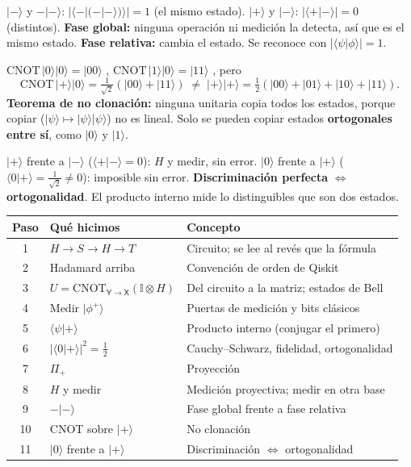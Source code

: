 \documentclass[11pt, a4paper, twoside, openright]{report}
\begin{document}
{$|-\rangle$ y $-|-\rangle$: \; $|\langle-|(-|-\rangle)\rangle| = 1$ \; (el mismo estado). \qquad $|+\rangle$ y $|-\rangle$: \; $|\langle+|-\rangle| = 0$ \; (distintos).}
{\textbf{Fase global:} ninguna operación ni medición la detecta, así que es el mismo estado. \textbf{Fase relativa:} cambia el estado. Se reconoce con $|\langle\psi|\phi\rangle| = 1$.}

{$\mathrm{CNOT}\,|0\rangle|0\rangle = |00\rangle$ \checkmark, \quad $\mathrm{CNOT}\,|1\rangle|0\rangle = |11\rangle$ \checkmark, \quad pero
\[ \mathrm{CNOT}\,|+\rangle|0\rangle = \tfrac{1}{\sqrt2}(|00\rangle + |11\rangle) \;\neq\; |+\rangle|+\rangle = \tfrac12(|00\rangle + |01\rangle + |10\rangle + |11\rangle). \]}
{\textbf{Teorema de no clonación:} ninguna unitaria copia todos los estados, porque copiar ($|\psi\rangle\mapsto|\psi\rangle|\psi\rangle$) no es lineal. Solo se pueden copiar estados \textbf{ortogonales entre sí}, como $|0\rangle$ y $|1\rangle$.}

{$|+\rangle$ frente a $|-\rangle$ ($\langle+|-\rangle = 0$): \; $H$ y medir, sin error. \qquad $|0\rangle$ frente a $|+\rangle$ ($\langle0|+\rangle = \frac{1}{\sqrt2}\neq0$): imposible sin error.}
{\textbf{Discriminación perfecta} $\iff$ \textbf{ortogonalidad}. El producto interno mide lo distinguibles que son dos estados.}

\begin{center}
\small\renewcommand{\arraystretch}{1.15}
\begin{tabular}{c|l|l}
\textbf{Paso} & \textbf{Qué hicimos} & \textbf{Concepto} \\ \hline
1 & $H\to S\to H\to T$ & Circuito; se lee al revés que la fórmula \\
2 & Hadamard arriba & Convención de orden de Qiskit \\
3 & $U = \mathrm{CNOT}_{\mathsf{Y}\to\mathsf{X}}(\mathbb{I}\otimes H)$ & Del circuito a la matriz; estados de Bell \\
4 & Medir $|\phi^+\rangle$ & Puertas de medición y bits clásicos \\
5 & $\langle\psi|+\rangle$ & Producto interno (conjugar el primero) \\
6 & $|\langle0|+\rangle|^2 = \frac12$ & Cauchy--Schwarz, fidelidad, ortogonalidad \\
7 & $\Pi_+$ & Proyección \\
8 & $H$ y medir & Medición proyectiva; medir en otra base \\
9 & $-|-\rangle$ & Fase global frente a fase relativa \\
10 & CNOT sobre $|+\rangle$ & No clonación \\
11 & $|0\rangle$ frente a $|+\rangle$ & Discriminación $\iff$ ortogonalidad
\end{tabular}
\end{center}
\end{document}
